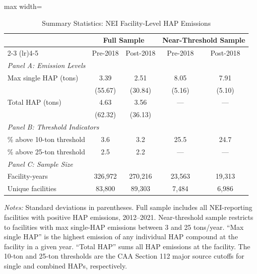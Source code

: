 \begin{table}[H]
\centering
\caption{Summary Statistics: NEI Facility-Level HAP Emissions}
\label{tab:summary}
\begin{threeparttable}
\begin{adjustbox}{max width=\textwidth}
\begin{tabular}{lcccc}
\toprule
 & \multicolumn{2}{c}{Full Sample} & \multicolumn{2}{c}{Near-Threshold Sample} \\
\cmidrule(lr){2-3} \cmidrule(lr){4-5}
 & Pre-2018 & Post-2018 & Pre-2018 & Post-2018 \\
\midrule
\multicolumn{5}{l}{\textit{Panel A: Emission Levels}} \\
Max single HAP (tons) & 3.39 & 2.51 & 8.05 & 7.91 \\
 & (55.67) & (30.84) & (5.16) & (5.10) \\
Total HAP (tons) & 4.63 & 3.56 & --- & --- \\
 & (62.32) & (36.13) & & \\
\midrule
\multicolumn{5}{l}{\textit{Panel B: Threshold Indicators}} \\
\% above 10-ton threshold & 3.6 & 3.2 & 25.5 & 24.7 \\
\% above 25-ton threshold & 2.5 & 2.2 & --- & --- \\
\midrule
\multicolumn{5}{l}{\textit{Panel C: Sample Size}} \\
Facility-years & 326,972 & 270,216 & 23,563 & 19,313 \\
Unique facilities & 83,800 & 89,303 & 7,484 & 6,986 \\
\bottomrule
\end{tabular}
\end{adjustbox}
\begin{tablenotes}[flushleft]
\small
\item \textit{Notes:} Standard deviations in parentheses. Full sample includes all NEI-reporting facilities with positive HAP emissions, 2012--2021. Near-threshold sample restricts to facilities with max single-HAP emissions between 3 and 25 tons/year. ``Max single HAP'' is the highest emission of any individual HAP compound at the facility in a given year. ``Total HAP'' sums all HAP emissions at the facility. The 10-ton and 25-ton thresholds are the CAA Section 112 major source cutoffs for single and combined HAPs, respectively.
\end{tablenotes}
\end{threeparttable}
\end{table}

